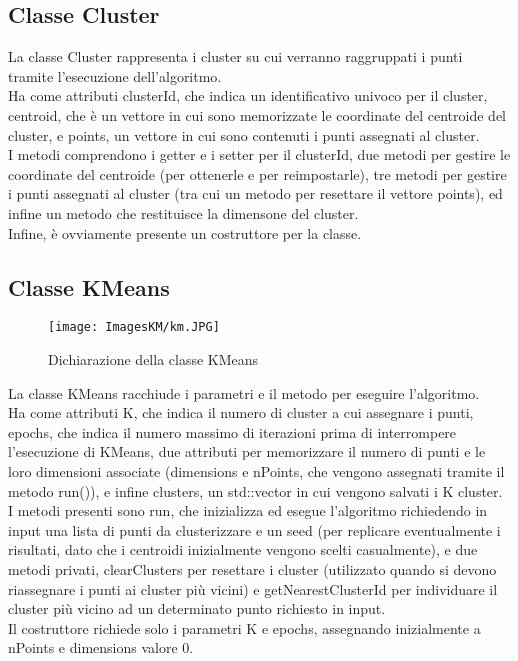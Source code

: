 \documentclass[10pt,twocolumn,letterpaper]{article}
\begin{document}
\subsection{Classe Cluster}
La classe Cluster rappresenta i cluster su cui verranno raggruppati i punti tramite l'esecuzione dell'algoritmo.\\
Ha come attributi clusterId, che  indica un identificativo univoco per il cluster, centroid, che è un vettore in cui sono memorizzate le coordinate del centroide del cluster, e points, un vettore in cui sono contenuti i punti assegnati al cluster.\\
I metodi comprendono i getter e i setter per il clusterId, due metodi per gestire le coordinate del centroide (per ottenerle e per reimpostarle), tre metodi per gestire i punti assegnati al cluster (tra cui un metodo per resettare il vettore points), ed infine un metodo che restituisce la dimensone del cluster.\\
Infine, è ovviamente presente un costruttore per la classe.

\subsection{Classe KMeans}

\begin{figure}[h]
    \centering
    \texttt{[image: ImagesKM/km.JPG]}
    \caption{Dichiarazione della classe KMeans}
    \label{fig:km}
\end{figure}

La classe KMeans racchiude i parametri e il metodo per eseguire l'algoritmo.\\
Ha come attributi K, che indica il numero di cluster a cui assegnare i punti, epochs, che indica il numero massimo di iterazioni prima di interrompere l'esecuzione di KMeans, due attributi per memorizzare il numero di punti e le loro dimensioni associate (dimensions e nPoints, che vengono assegnati tramite il metodo run()), e infine clusters, un std::vector in cui vengono salvati i K cluster.\\
I metodi presenti sono run, che inizializza ed esegue l'algoritmo richiedendo in input una lista di punti da clusterizzare e un seed (per replicare eventualmente i risultati, dato che i centroidi inizialmente vengono scelti casualmente), e due metodi privati, clearClusters per resettare i cluster (utilizzato quando si devono riassegnare i punti ai cluster più vicini) e getNearestClusterId per individuare il cluster più vicino ad un determinato punto richiesto in input.\\
Il costruttore richiede solo i parametri K e epochs, assegnando inizialmente a nPoints e dimensions valore 0.
\end{document}
